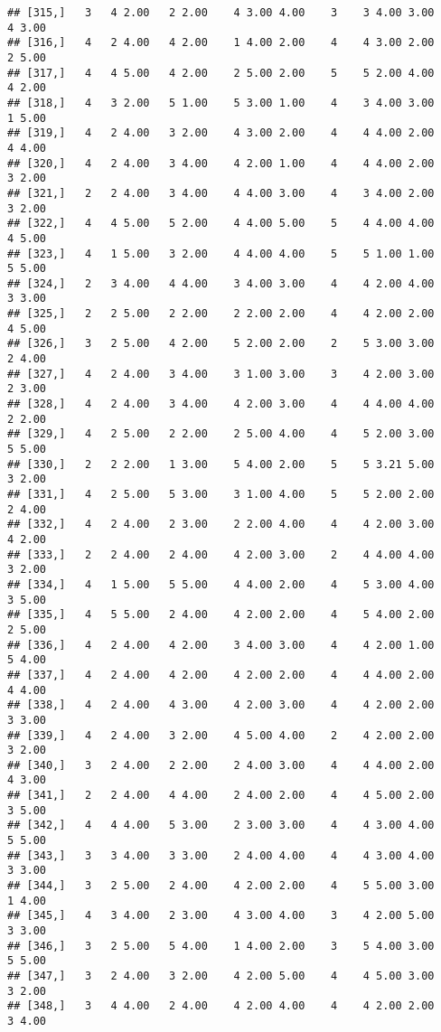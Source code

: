 \documentclass[]{article}
\begin{document}
\begin{verbatim}
## [315,]   3   4 2.00   2 2.00    4 3.00 4.00    3    3 4.00 3.00    4 3.00
## [316,]   4   2 4.00   4 2.00    1 4.00 2.00    4    4 3.00 2.00    2 5.00
## [317,]   4   4 5.00   4 2.00    2 5.00 2.00    5    5 2.00 4.00    4 2.00
## [318,]   4   3 2.00   5 1.00    5 3.00 1.00    4    3 4.00 3.00    1 5.00
## [319,]   4   2 4.00   3 2.00    4 3.00 2.00    4    4 4.00 2.00    4 4.00
## [320,]   4   2 4.00   3 4.00    4 2.00 1.00    4    4 4.00 2.00    3 2.00
## [321,]   2   2 4.00   3 4.00    4 4.00 3.00    4    3 4.00 2.00    3 2.00
## [322,]   4   4 5.00   5 2.00    4 4.00 5.00    5    4 4.00 4.00    4 5.00
## [323,]   4   1 5.00   3 2.00    4 4.00 4.00    5    5 1.00 1.00    5 5.00
## [324,]   2   3 4.00   4 4.00    3 4.00 3.00    4    4 2.00 4.00    3 3.00
## [325,]   2   2 5.00   2 2.00    2 2.00 2.00    4    4 2.00 2.00    4 5.00
## [326,]   3   2 5.00   4 2.00    5 2.00 2.00    2    5 3.00 3.00    2 4.00
## [327,]   4   2 4.00   3 4.00    3 1.00 3.00    3    4 2.00 3.00    2 3.00
## [328,]   4   2 4.00   3 4.00    4 2.00 3.00    4    4 4.00 4.00    2 2.00
## [329,]   4   2 5.00   2 2.00    2 5.00 4.00    4    5 2.00 3.00    5 5.00
## [330,]   2   2 2.00   1 3.00    5 4.00 2.00    5    5 3.21 5.00    3 2.00
## [331,]   4   2 5.00   5 3.00    3 1.00 4.00    5    5 2.00 2.00    2 4.00
## [332,]   4   2 4.00   2 3.00    2 2.00 4.00    4    4 2.00 3.00    4 2.00
## [333,]   2   2 4.00   2 4.00    4 2.00 3.00    2    4 4.00 4.00    3 2.00
## [334,]   4   1 5.00   5 5.00    4 4.00 2.00    4    5 3.00 4.00    3 5.00
## [335,]   4   5 5.00   2 4.00    4 2.00 2.00    4    5 4.00 2.00    2 5.00
## [336,]   4   2 4.00   4 2.00    3 4.00 3.00    4    4 2.00 1.00    5 4.00
## [337,]   4   2 4.00   4 2.00    4 2.00 2.00    4    4 4.00 2.00    4 4.00
## [338,]   4   2 4.00   4 3.00    4 2.00 3.00    4    4 2.00 2.00    3 3.00
## [339,]   4   2 4.00   3 2.00    4 5.00 4.00    2    4 2.00 2.00    3 2.00
## [340,]   3   2 4.00   2 2.00    2 4.00 3.00    4    4 4.00 2.00    4 3.00
## [341,]   2   2 4.00   4 4.00    2 4.00 2.00    4    4 5.00 2.00    3 5.00
## [342,]   4   4 4.00   5 3.00    2 3.00 3.00    4    4 3.00 4.00    5 5.00
## [343,]   3   3 4.00   3 3.00    2 4.00 4.00    4    4 3.00 4.00    3 3.00
## [344,]   3   2 5.00   2 4.00    4 2.00 2.00    4    5 5.00 3.00    1 4.00
## [345,]   4   3 4.00   2 3.00    4 3.00 4.00    3    4 2.00 5.00    3 3.00
## [346,]   3   2 5.00   5 4.00    1 4.00 2.00    3    5 4.00 3.00    5 5.00
## [347,]   3   2 4.00   3 2.00    4 2.00 5.00    4    4 5.00 3.00    3 2.00
## [348,]   3   4 4.00   2 4.00    4 2.00 4.00    4    4 2.00 2.00    3 4.00

\end{verbatim}
\end{document}
